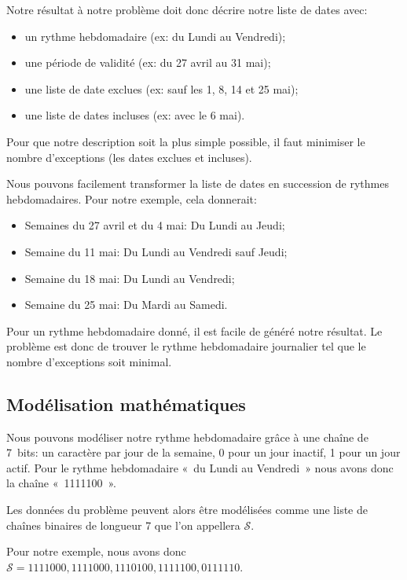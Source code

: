 \documentclass{roadef}
\def\S{\mathcal{S}}
\begin{document}
Notre résultat à notre problème doit donc décrire notre liste de dates
avec:
\begin{itemize}
\item un rythme hebdomadaire (ex: du Lundi au Vendredi);
\item une période de validité (ex: du 27 avril au 31 mai);
\item une liste de date exclues (ex: sauf les 1, 8, 14 et 25 mai);
\item une liste de dates incluses (ex: avec le 6 mai).
\end{itemize}

Pour que notre description soit la plus simple possible, il faut
minimiser le nombre d'exceptions (les dates exclues et incluses).

Nous pouvons facilement transformer la liste de dates en succession de
rythmes hebdomadaires. Pour notre exemple, cela donnerait:
\begin{itemize}
\item Semaines du 27 avril et du 4 mai: Du Lundi au Jeudi;
\item Semaine du 11 mai: Du Lundi au Vendredi sauf Jeudi;
\item Semaine du 18 mai: Du Lundi au Vendredi;
\item Semaine du 25 mai: Du Mardi au Samedi.
\end{itemize}

Pour un rythme hebdomadaire donné, il est facile de généré notre
résultat.  Le problème est donc de trouver le rythme hebdomadaire
journalier tel que le nombre d'exceptions soit minimal.

\subsection{Modélisation mathématiques}

Nous pouvons modéliser notre rythme hebdomadaire grâce à une chaîne de
7~bits: un caractère par jour de la semaine, 0 pour un jour inactif, 1
pour un jour actif. Pour le rythme hebdomadaire «~du Lundi au
Vendredi~» nous avons donc la chaîne «~1111100~».

Les données du problème peuvent alors être modélisées comme une liste
de chaînes binaires de longueur 7 que l'on appellera $\S$.

Pour notre exemple, nous avons donc
\begin{math}
  \S = 1111000, 1111000, 1110100, 1111100, 0111110
\end{math}.
\end{document}
